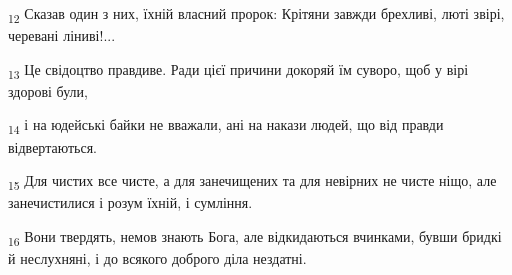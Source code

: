 \begin{tcolorbox}
\textsubscript{12} Сказав один з них, їхній власний пророк: Крітяни завжди брехливі, люті звірі, черевані ліниві!...
\end{tcolorbox}
\begin{tcolorbox}
\textsubscript{13} Це свідоцтво правдиве. Ради цієї причини докоряй їм суворо, щоб у вірі здорові були,
\end{tcolorbox}
\begin{tcolorbox}
\textsubscript{14} і на юдейські байки не вважали, ані на накази людей, що від правди відвертаються.
\end{tcolorbox}
\begin{tcolorbox}
\textsubscript{15} Для чистих все чисте, а для занечищених та для невірних не чисте ніщо, але занечистилися і розум їхній, і сумління.
\end{tcolorbox}
\begin{tcolorbox}
\textsubscript{16} Вони твердять, немов знають Бога, але відкидаються вчинками, бувши бридкі й неслухняні, і до всякого доброго діла нездатні.
\end{tcolorbox}
